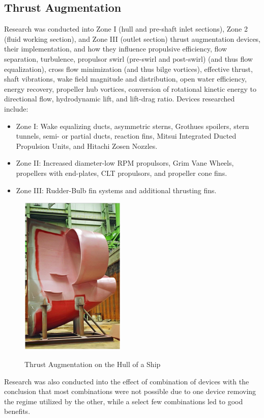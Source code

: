 \documentclass{report}
\begin{document}
\subsection{Thrust Augmentation}
Research was conducted into Zone I (hull and pre-shaft inlet sections), Zone 2 (fluid working section), and Zone III (outlet section) thrust augmentation devices, their implementation, and how they influence propulsive efficiency, flow separation, turbulence, propulsor swirl (pre-swirl and post-swirl) (and thus flow equalization), cross flow minimization (and thus bilge vortices), effective thrust, shaft vibrations, wake field magnitude and distribution, open water efficiency, energy recovery, propeller hub vortices, conversion of rotational kinetic energy to directional flow, hydrodynamic lift, and lift-drag ratio.  Devices researched include:
\begin{itemize}
\item Zone I: Wake equalizing ducts, asymmetric sterns, Grothues spoilers, stern tunnels, semi- or partial ducts, reaction fins, Mitsui Integrated Ducted Propulsion Units, and Hitachi Zosen Nozzles.
\item Zone II: Increased diameter-low RPM propulsors, Grim Vane Wheels, propellers with end-plates, CLT propulsors, and propeller cone fins.
\item Zone III: Rudder-Bulb fin systems and additional thrusting fins.
\end{itemize}
\begin{figure}[h]
\centering
\includegraphics[width=5cm]{"Thrust Augmentation"}
\caption{Thrust Augmentation on the Hull of a Ship}
\cite{Grotheus}
\end{figure}
\indent Research was also conducted into the effect of combination of devices with the conclusion that most combinations were not possible due to one device removing the regime utilized by the other, while a select few combinations led to good benefits.
\end{document}
